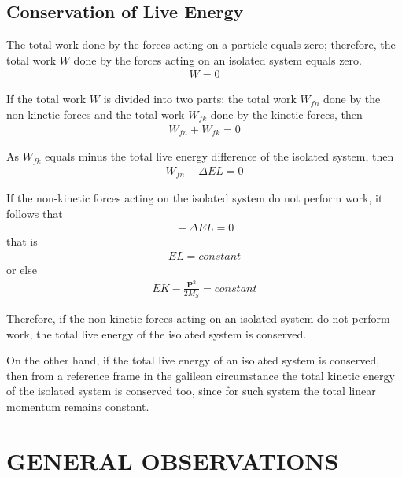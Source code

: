 \documentclass[12pt]{article}
\newcommand{\yN}{\newpage}%
\newcommand{\yT}{\bigskip}%
\newcommand{\yS}{\medskip}%
\newcommand{\cA}{\centering}%
\newcommand{\cT}{\cA\section}%
\newcommand{\cS}{\cA\subsection}%
\newcommand{\ct}[1]{}%
\newcommand{\cs}[1]{}%
\newcommand{\vP}{\mathbf{P}}
\newcommand{\nK}{{\scriptstyle K}}
\newcommand{\nL}{{\scriptstyle L}}
\newcommand{\mN}{M}
\newcommand{\mW}{W}
\newcommand{\mE}{E}
\newcommand{\rS}{_S}
\newcommand{\rfn}{_{fn}}
\newcommand{\rfk}{_{fk}}
\newcommand{\tc}{constant}
\begin{document}
\yS \vspace{-1.5em}

{\cs{Conservation of Live Energy}}
{\cS{Conservation of Live Energy}}

\par The total work done by the forces acting on a particle equals zero; therefore, the total work $\mW$ done by the forces acting on an isolated system equals zero.
\begin{eqnarray*}
\mW = 0
\end{eqnarray*}

\yN \baselineskip=14.5pt \enlargethispage{0em}

\par If the total work $\mW$ is divided into two parts: the total work $\mW\rfn$ done by the non-kinetic forces and the total work $\mW\rfk$ done by the kinetic forces, then
\begin{eqnarray*}
\mW\rfn + \mW\rfk = 0
\end{eqnarray*}
\par As $\mW\rfk$ equals minus the total live energy difference of the isolated system, then
\begin{eqnarray*}
\mW\rfn - \Delta \mE\nL = 0
\end{eqnarray*}
\par If the non-kinetic forces acting on the isolated system do not perform work, it follows that
\begin{eqnarray*}
\! -\Delta \mE\nL = 0
\end{eqnarray*}
\noindent that is
\begin{eqnarray*}
\mE\nL = \tc
\end{eqnarray*}
\noindent or else
\begin{eqnarray*}
\mE\nK - \frac{\vP^2}{2\mN\rS} = \tc
\end{eqnarray*}
\par Therefore, if the non-kinetic forces acting on an isolated system do not perform work, the total live energy of the isolated system is conserved.
\par On the other hand, if the total live energy of an isolated system is conserved, then from a reference frame in the galilean circumstance the total kinetic energy of the isolated system is conserved too, since for such system the total linear momentum remains constant.

\yT \vspace{-1.5em}

{\ct{GENERAL OBSERVATIONS}}
{\cT{GENERAL OBSERVATIONS}}
\end{document}
